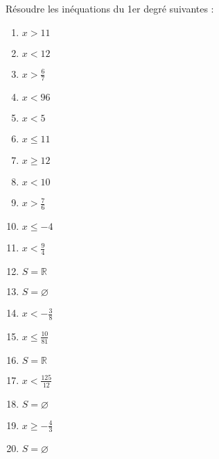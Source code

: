 \begin{solution}
Résoudre les inéquations du 1er degré suivantes : 
\begin{multicols}{3}
\begin{enumerate}
\item $x>11$	
\item $x<12$
\item $x>\frac{6}{7}$	
\item $x<96$	
\item $x<5$
\item $x\le 11$
\item $x\ge 12$
\item $x<10$
\item $x>\frac{7}{6}$
\item $x\le -4$
\item $x<\frac{9}{4}$
\item $S=\mathbb{R}$
\item $S=\varnothing $
\item $x<-\frac{3}{8}$
\item $x\le \frac{10}{81}$
\item $S=\mathbb{R}$
\item $x<\frac{125}{12}$
\item $S=\varnothing $
\item $x\ge -\frac{4}{3}$
\item $S=\varnothing $
\end{enumerate}
\end{multicols}
\end{solution}

